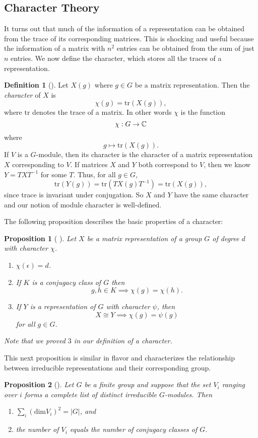 \documentclass[12pt,twoside]{reedthesis}
\theoremstyle{plain}   %
\newtheorem{prop}{Proposition}[section]
\theoremstyle{definition}
\newtheorem{defn}{Definition}[section]
\theoremstyle{remark}
\numberwithin{equation}{section}
\def\dim{\mathrm{dim}}
\def\tr{\mathrm{tr}}
\begin{document}
  \subsection{Character Theory}
  It turns out that much of the information of a representation can be obtained from the trace of its corresponding matrices.
  This is shocking and useful because the information of a matrix with $n^2$ entries can be obtained from the sum of just $n$ entries.
  We now define the character, which stores all the traces of a representation.
  \begin{defn}[{\cite[Definition 1.8.1]{sagan}}]
    Let $X(g)$ where $g \in G$ be a matrix representation. Then the \emph{character} of $X$ is
    \[ \chi(g) = \tr (X(g)),\]
    where $\tr$ denotes the trace of a matrix. In other words $\chi$ is the function
    \[\chi: G \to \mathbb{C}\]
    where
    \[g \mapsto \tr (X(g)).\]
    If $V$ is a $G$-module, then its character is the character of a matrix representation $X$ corresponding to $V$.
    If matrices $X$ and $Y$ both correspond to $V$, then we know $Y = TXT^{-1}$ for some $T$. Thus, for all $g \in G$,
    \[\tr ( Y(g)) = \tr( TX(g)T^{-1}) = \tr( X(g)),\]
    since trace is invariant under conjugation. So $X$ and $Y$ have the same character and our notion of module character is well-defined.
  \end{defn}
  The following proposition describes the basic properties of a character:
  \begin{prop}[{ \cite[Proposition 1.8.5]{sagan}}]
    Let $X$ be a matrix representation of a group $G$ of degree $d$ with character $\chi$.
    \begin{enumerate}
    \item $\chi( \epsilon) = d$.
    \item If $K$ is a conjugacy class of $G$ then
      \[ g, h \in K \implies \chi(g) = \chi(h). \]
    \item If $Y$ is a representation of $G$ with character $\psi$, then
      \[ X \cong Y \implies \chi(g) = \psi(g) \]
      for all $g \in G$.
    \end{enumerate}
    Note that we proved $3$ in our definition of a character.
  \end{prop}
    
  This next proposition is similar in flavor and characterizes the relationship between irreducible representations
  and their corresponding group.

  \begin{prop}[{\cite[Proposition 1.10.1]{sagan}}]
    Let $G$ be a finite group and suppose that the set $V_i$ ranging over $i$ forms a complete list of
    distinct irreducible $G$-modules. Then
    \begin{enumerate}
    \item $\sum_i (\dim V_i)^2 = |G|$, and
    \item the number of $V_i$ equals the number of conjugacy classes of $G$.
    \end{enumerate}
  \end{prop}   
  
\end{document}

